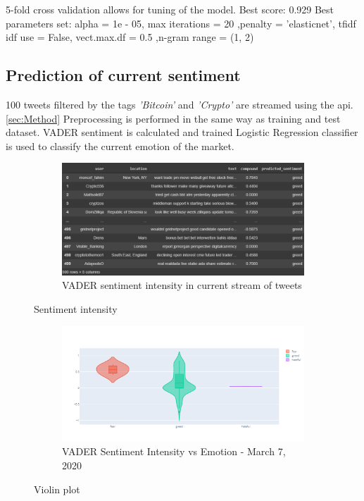 \documentclass[a4paper, 12pt]{article}
\begin{document}
5-fold cross validation allows for tuning of the model.
Best score: 0.929
Best parameters set: alpha =  1e - 05, max iterations = 20 ,penalty = 'elasticnet', tfidf idf use = False, vect.max.df = 0.5 ,n-gram range =  (1, 2)


\subsection{Prediction of current sentiment}
100 tweets filtered by the tags \textit{'Bitcoin'} and \textit{'Crypto'} are streamed using the api.  \ref{sec:Method}
Preprocessing is performed in the same way as training and test dataset. VADER sentiment is calculated and trained Logistic Regression classifier is used to classify the current emotion of the market.

\begin{figure}[H]
    \centering
    \begin{subfigure}[a]{0.99\textwidth}
        \includegraphics[width=\textwidth]{res/currenttweets_res.png}
        \caption{VADER sentiment intensity in current stream of tweets}
    \end{subfigure}
		\caption{Sentiment intensity}
		\label{fig:senint}
\end{figure}

\begin{figure}[H]
    \centering
    \begin{subfigure}[a]{0.99\textwidth}
        \includegraphics[width=\textwidth]{res/vaderfinal.png}
        \caption{VADER Sentiment Intensity vs Emotion - March 7, 2020}
    \end{subfigure}
		\caption{Violin plot}
		\label{fig:violin2}
\end{figure}
\end{document}
